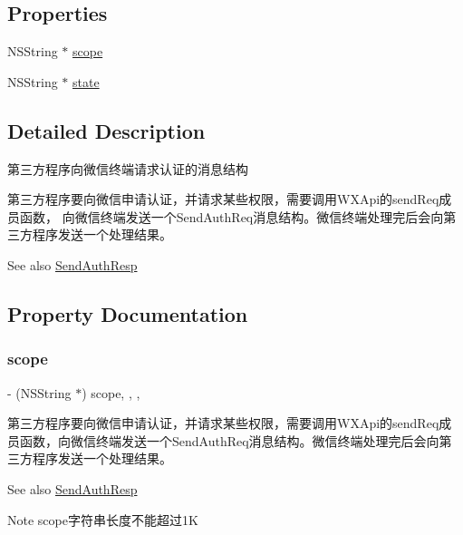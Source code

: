 \subsection*{Properties}
\begin{DoxyCompactItemize}
\item 
N\+S\+String $\ast$ \mbox{\hyperlink{interface_send_auth_req_a14d6333822e8c12b42d4d62c3e906a1a}{scope}}
\item 
N\+S\+String $\ast$ \mbox{\hyperlink{interface_send_auth_req_a7e9608c87df942448564ba1be8d11ac5}{state}}
\end{DoxyCompactItemize}


\subsection{Detailed Description}
第三方程序向微信终端请求认证的消息结构 

第三方程序要向微信申请认证，并请求某些权限，需要调用\+W\+X\+Api的send\+Req成员函数， 向微信终端发送一个\+Send\+Auth\+Req消息结构。微信终端处理完后会向第三方程序发送一个处理结果。 \begin{DoxySeeAlso}{See also}
\mbox{\hyperlink{interface_send_auth_resp}{Send\+Auth\+Resp}} 
\end{DoxySeeAlso}


\subsection{Property Documentation}
\mbox{\label{interface_send_auth_req_a14d6333822e8c12b42d4d62c3e906a1a}} 
\subsubsection{\texorpdfstring{scope}{scope}}
{\footnotesize\ttfamily -\/ (N\+S\+String $\ast$) scope\hspace{0.3cm}{\ttfamily [read]}, {\ttfamily [write]}, {\ttfamily [nonatomic]}, {\ttfamily [retain]}}

第三方程序要向微信申请认证，并请求某些权限，需要调用\+W\+X\+Api的send\+Req成员函数，向微信终端发送一个\+Send\+Auth\+Req消息结构。微信终端处理完后会向第三方程序发送一个处理结果。 \begin{DoxySeeAlso}{See also}
\mbox{\hyperlink{interface_send_auth_resp}{Send\+Auth\+Resp}} 
\end{DoxySeeAlso}
\begin{DoxyNote}{Note}
scope字符串长度不能超过1K 
\end{DoxyNote}
\mbox{\label{interface_send_auth_req_a7e9608c87df942448564ba1be8d11ac5}} 
